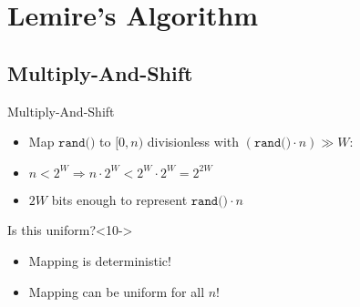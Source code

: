 \section{Lemire's Algorithm}

\subsection{Multiply-And-Shift}\label{sec:3.1}
\begin{frame}{Multiply-And-Shift}
    \pause 
    \begin{itemize}
        \item Map $\texttt{rand()}$ to $[0,n)$ divisionless with $(\texttt{rand()} \cdot n) \gg W$:
        \only<5>{\begin{align*}\large
            (\underbrace{\texttt{rand()}}_{{} \in [0,2^W)} \cdot n) \div 2^W  
        \end{align*}}
        \only<6-8>{\begin{align*}\large
            \underbrace{(\texttt{rand()} \cdot n)}_{{} \in [0,n \cdot 2^W)} \div 2^W  
        \end{align*}}
        \only<9->{\begin{align*}\large
            \underbrace{(\texttt{rand()} \cdot n) \div 2^W}_{{} \in [0,n)}
        \end{align*}}
        \item<7-> $n < 2^W \Longrightarrow n \cdot 2^W < 2^W \cdot 2^W = 2^{2W}$
        \item<8-> $2W$ bits enough to represent $\texttt{rand()} \cdot n$  
    \end{itemize}
    \vspace*{0.5cm}
    \begin{block}{Is this uniform?}<10->
        \begin{itemize}
            \item<11-> Mapping is deterministic!
            \item<12-> Mapping can  be uniform for all $n$!
        \end{itemize}
    \end{block}
\end{frame}

